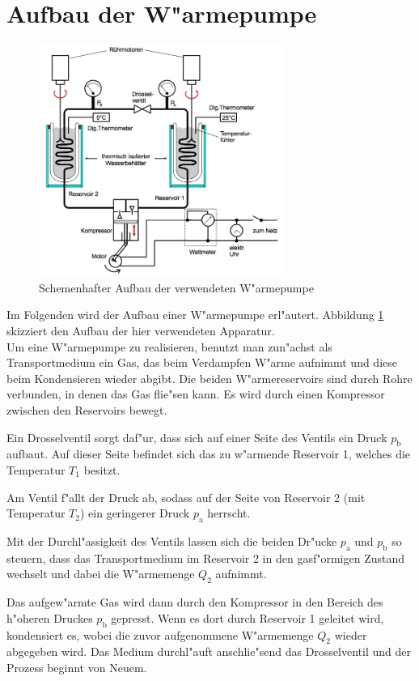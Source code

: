 \section{Aufbau der W"armepumpe}
\label{sec:aufbau}
	\begin{figure}
		\centering
		\includegraphics[width = 8cm]{img/pumpe.jpeg}
		\caption{Schemenhafter Aufbau der verwendeten W"armepumpe \cite{anleitung} \label{fig:pumpe}}
	\end{figure}

	Im Folgenden wird der Aufbau einer W"armepumpe erl"autert.
	Abbildung \ref{fig:pumpe} skizziert den Aufbau der hier verwendeten Apparatur. \\

	Um eine W"armepumpe zu realisieren, benutzt man zun"achst als Transportmedium ein Gas, das beim Verdampfen W"arme aufnimmt und diese beim Kondensieren wieder abgibt.
	Die beiden W"armereservoirs sind durch Rohre verbunden, in denen das Gas flie"sen kann.
	Es wird durch einen Kompressor zwischen den Reservoirs bewegt.

	Ein Drosselventil sorgt daf"ur, dass sich auf einer Seite des Ventils ein Druck $p_\mathrm{b}$ aufbaut.
	Auf dieser Seite befindet sich das zu w"armende Reservoir 1, welches die Temperatur $T_1$ besitzt.

	Am Ventil f"allt der Druck ab, sodass auf der Seite von Reservoir 2 (mit Temperatur $T_2$) ein geringerer Druck $p_\mathrm{a}$ herrscht.

	Mit der Durchl"assigkeit des Ventils lassen sich die beiden Dr"ucke $p_\mathrm{a}$ und $p_\mathrm{b}$ so steuern, dass das Transportmedium im Reservoir 2 in den gasf"ormigen Zustand wechselt und dabei die W"armemenge $Q_2$ aufnimmt.

	Das aufgew"armte Gas wird dann durch den Kompressor in den Bereich des h"oheren Druckes $p_\mathrm{b}$ gepresst.
	Wenn es dort durch Reservoir 1 geleitet wird, kondensiert es, wobei die zuvor aufgenommene W"armemenge $Q_2$ wieder abgegeben wird.
	Das Medium durchl"auft anschlie"send das Drosselventil und der Prozess beginnt von Neuem.

